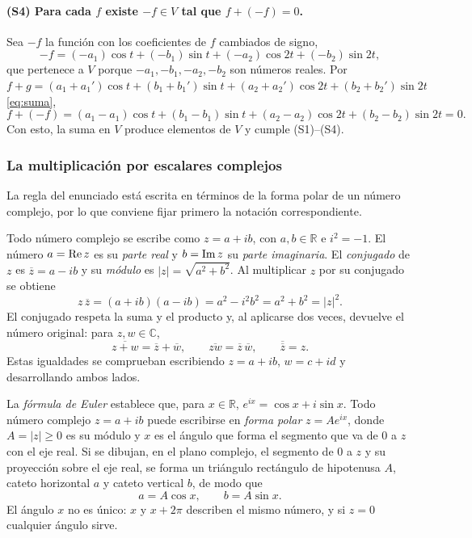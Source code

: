 \paragraph{(S4) Para cada $f$ existe $-f\in V$ tal que $f+(-f) = 0$.}
Sea $-f$ la función con los coeficientes de $f$ cambiados de signo,
\[
  -f = (-a_1)\cos t + (-b_1)\sin t + (-a_2)\cos 2t + (-b_2)\sin 2t,
\]
que pertenece a $V$ porque $-a_1, -b_1, -a_2, -b_2$ son números reales. Por $f+g=(a_1+a_1')\cos t+(b_1+b_1')\sin t+(a_2+a_2')\cos 2t+(b_2+b_2')\sin 2t$ \eqref{eq:suma},
\[
  f+(-f) = (a_1-a_1)\cos t + (b_1-b_1)\sin t + (a_2-a_2)\cos 2t + (b_2-b_2)\sin 2t = 0.
\]
Con esto, la suma en $V$ produce elementos de $V$ y cumple (S1)--(S4).

\subsubsection*{La multiplicación por escalares complejos}

La regla del enunciado está escrita en términos de la forma polar de un número complejo, por
lo que conviene fijar primero la notación correspondiente.

\begin{definicionT}
Todo número complejo se escribe como $z=a+ib$, con $a,b\in\mathbb R$ e $i^2=-1$. El número
$a=\operatorname{Re} z$ es su \emph{parte real} y $b=\operatorname{Im} z$ su \emph{parte imaginaria}. El
\emph{conjugado} de $z$ es $\overline z=a-ib$ y su \emph{módulo} es $|z|=\sqrt{a^2+b^2}$. Al
multiplicar $z$ por su conjugado se obtiene
\begin{equation}\label{eq:modulo}
  z\,\overline z=(a+ib)(a-ib)=a^2-i^2b^2=a^2+b^2=|z|^2 .
\end{equation}
El conjugado respeta la suma y el producto y, al aplicarse dos veces, devuelve el número
original: para $z,w\in\mathbb C$,
\begin{equation}\label{eq:conjugado}
  \overline{z+w}=\overline z+\overline w,\qquad
  \overline{zw}=\overline z\,\overline w,\qquad
  \overline{\overline z}=z .
\end{equation}
Estas igualdades se comprueban escribiendo $z=a+ib$, $w=c+id$ y desarrollando ambos lados.
\end{definicionT}

\begin{definicionT}
La \emph{fórmula de Euler} establece que, para $x\in\mathbb R$,
$e^{ix}=\cos x+i\sin x$. Todo número complejo $z=a+ib$ puede escribirse en \emph{forma polar}
$z=Ae^{ix}$, donde $A=|z|\ge 0$ es su módulo y $x$ es el ángulo que forma el segmento que va
de $0$ a $z$ con el eje real. Si se dibujan, en el plano complejo, el segmento de $0$ a $z$ y
su proyección sobre el eje real, se forma un triángulo rectángulo de hipotenusa $A$, cateto
horizontal $a$ y cateto vertical $b$, de modo que
\begin{equation}\label{eq:polar}
  a=A\cos x,\qquad b=A\sin x .
\end{equation}
El ángulo $x$ no es único: $x$ y $x+2\pi$ describen el mismo número, y si $z=0$ cualquier
ángulo sirve.
\end{definicionT}


